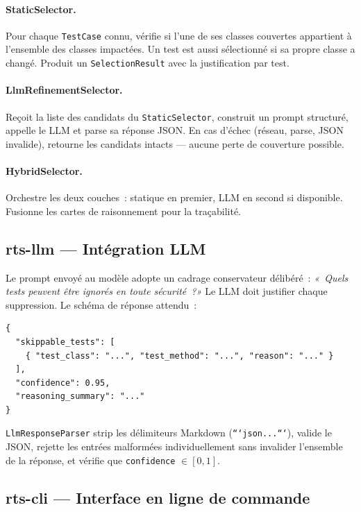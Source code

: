 \documentclass[12pt,a4paper]{article}
\begin{document}
\paragraph{StaticSelector.} Pour chaque \texttt{TestCase} connu, vérifie si
l'une de ses classes couvertes appartient à l'ensemble des classes impactées.
Un test est aussi sélectionné si sa propre classe a changé. Produit un
\texttt{SelectionResult} avec la justification par test.

\paragraph{LlmRefinementSelector.} Reçoit la liste des candidats du
\texttt{StaticSelector}, construit un prompt structuré, appelle le LLM et
parse sa réponse JSON. En cas d'échec (réseau, parse, JSON invalide), retourne
les candidats intacts — aucune perte de couverture possible.

\paragraph{HybridSelector.} Orchestre les deux couches~: statique en premier,
LLM en second si disponible. Fusionne les cartes de raisonnement pour la
traçabilité.

\subsection{rts-llm — Intégration LLM}

Le prompt envoyé au modèle adopte un cadrage conservateur délibéré~:
\textit{«~Quels tests peuvent être ignorés en toute sécurité~?»} Le LLM doit
justifier chaque suppression. Le schéma de réponse attendu~:

\begin{lstlisting}[language={}]
{
  "skippable_tests": [
    { "test_class": "...", "test_method": "...", "reason": "..." }
  ],
  "confidence": 0.95,
  "reasoning_summary": "..."
}
\end{lstlisting}

\texttt{LlmResponseParser} strip les délimiteurs Markdown
(\texttt{```json...```}), valide le JSON, rejette les entrées malformées
individuellement sans invalider l'ensemble de la réponse, et vérifie que
\texttt{confidence} $\in [0, 1]$.

\subsection{rts-cli — Interface en ligne de commande}
\end{document}
